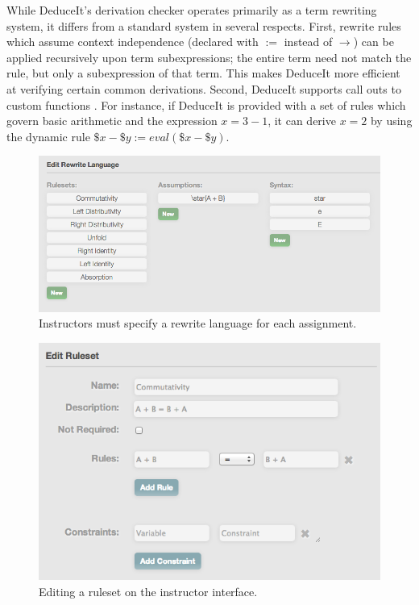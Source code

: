 \documentclass{sigchi}
\begin{document}
While DeduceIt's derivation checker operates primarily as a term rewriting system, it differs from a standard system in several respects. First, rewrite rules which assume context independence (declared with $:=$ instead of $\rightarrow$) can be applied recursively upon term subexpressions; the entire term need not match the rule, but only a subexpression of that term. This makes DeduceIt more efficient at verifying certain common derivations. Second, DeduceIt supports call outs to custom functions \cite{dynamic-rules}. For instance, if DeduceIt is provided with a set of rules which govern basic arithmetic  and the expression $x=3-1$, it can derive $x=2$ by using the dynamic rule $\$x-\$y := eval(\$x-\$y)$.


\begin{figure}[tb]
\centering
\includegraphics[width=1\columnwidth]{rewrite_language}
\caption{Instructors must specify a rewrite language for each assignment.}
\label{fig:rewrite_language}
\end{figure}

\begin{figure}[tb]
\centering
\includegraphics[width=1\columnwidth]{editruleset}
\caption{Editing a ruleset on the instructor interface.}
\label{fig:editruleset}
\end{figure}
\end{document}
